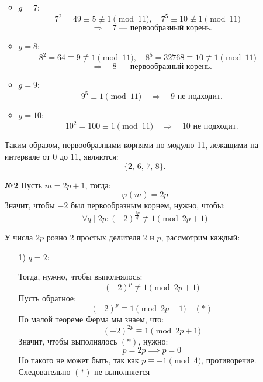 \documentclass[a4paper]{article}
\renewcommand{\f}[2]{\frac{#1}{#2}}
\renewcommand{\phi}{\varphi}
\newcommand{\divides}{\;|\;}
\begin{document}
\begin{enumerate}
\begin{itemize}
        \item \( g = 7 \):
        \[
        7^2 = 49 \equiv 5 \not\equiv 1 \pmod{11}, \quad 7^5 \equiv 10 \not\equiv 
        1 \pmod{11} \quad\]\[ \Rightarrow \quad 7 \text{ --- первообразный корень.}
        \]
        
        \item \( g = 8 \):
        \[
        8^2 = 64 \equiv 9 \not\equiv 1 \pmod{11}, \quad 8^5 = 32768 \equiv 10
         \not\equiv 1 \pmod{11} \quad \]\[\Rightarrow \quad 8 \text{ --- первообразный корень.}
        \]
        
        \item \( g = 9 \):
        \[
        9^5 \equiv 1 \pmod{11} \quad \Rightarrow \quad 9 \text{ не подходит.}
        \]
        
        \item \( g = 10 \):
        \[
        10^2 = 100 \equiv 1 \pmod{11} \quad \Rightarrow \quad 10 \text{ не подходит.}
        \]
    \end{itemize}
    
    Таким образом, первообразными корнями по модулю 11, лежащими на интервале от 0 до 11, являются:
    \[
    \{2,\, 6,\, 7,\, 8\}.
    \]
    

    \item[\textbf{№2}]Пусть $m = 2p+1$, тогда:
    $$\phi(m) = 2p$$
    Значит, чтобы $-2$ был первообразным корнем, нужно, чтобы:
    $$\forall q \divides 2p : (-2)^{\f{2p}{q}} \not\equiv 1 \pmod{2p+1}$$
    
    У числа $2p$ ровно 2 простых делителя $2$ и $p$, рассмотрим каждый:
    \begin{enumerate}
        \item[1)] $q = 2$:
        
        Тогда, нужно, чтобы выполнялось:
        $$(-2)^{p} \not \equiv 1 \pmod{2p+1}$$
        Пусть обратное:
        $$(-2)^{p}  \equiv 1 \pmod{2p+1} \quad (*)$$
        По малой теореме Ферма мы знаем, что:
        $$(-2)^{2p} \equiv 1 \pmod{2p+1}$$
        Значит, чтобы выполнялось $(*)$, нужно:
        $$p = 2p \implies p = 0$$
        Но такого не может быть, так как $p \equiv -1 \pmod{4}$, противоречие. 
        Следовательно $(*)$ не выполняется


\end{enumerate}
\end{enumerate}
\end{document}
